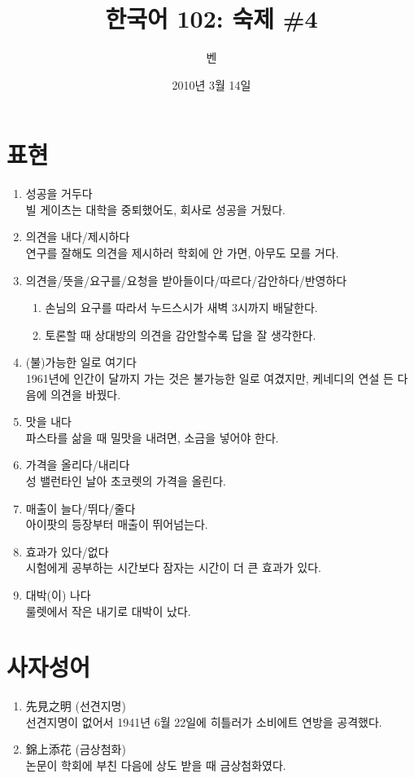 \documentclass[11pt]{article}
\title{한국어 102: 숙제 \#4}
\author{벤}
\date{2010년 3월 14일}
\begin{document}
\maketitle
\thispagestyle{empty}
\pagestyle{empty}

\section{표현}
\begin{enumerate}
\item 성공을 거두다 \\
   빌 게이츠는 대학을 중퇴했어도, 회사로 성공을 거뒀다.

\item 의견을 내다/제시하다 \\
  연구를 잘해도 의견을 제시하러 학회에 안 가면, 아무도 모를 거다.

\item 의견을/뜻을/요구를/요청을 받아들이다/따르다/감안하다/반영하다
\begin{enumerate}
\item 손님의 요구를 따라서 누드스시가 새벽 3시까지 배달한다.
\item 토론할 때 상대방의 의견을 감안할수록 답을 잘 생각한다. 
\end{enumerate}
\item (불)가능한 일로 여기다 \\
  1961년에 인간이 달까지 가는 것은 불가능한 일로 여겼지만, 케네디의 연설 든 다음에 의견을 바꿨다.
\item 맛을 내다 \\
  파스타를 삶을 때 밀맛을 내려면, 소금을 넣어야 한다.
\item 가격을 올리다/내리다 \\
  성 밸런타인 날아 초코렛의 가격을 올린다.
\item 매출이 늘다/뛰다/줄다 \\
  아이팟의 등장부터 매출이 뛰어넘는다.
\item 효과가 있다/없다 \\
  시험에게 공부하는 시간보다 잠자는 시간이 더 큰 효과가 있다. 
\item 대박(이) 나다 \\
  룰렛에서 작은 내기로 대박이 났다.
\end{enumerate}

\section{사자성어}
\begin{enumerate}
\item 先見之明 (선견지명) \\
  선견지명이 없어서 1941년 6월 22일에 히틀러가 소비에트 연방을 공격했다.
\item 錦上添花 (금상첨화) \\
  논문이 학회에 부친 다음에 상도 받을 때 금상첨화였다.
\end{enumerate}
\end{document}
